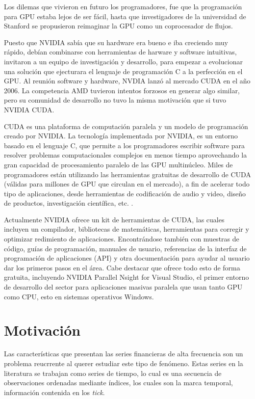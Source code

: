 Los dilemas que vivieron en futuro los programadores, fue que la programación para GPU estaba lejos de ser fácil, hasta que investigadores de la universidad de
Stanford se propusieron reimaginar la GPU como un coprocesador de flujos.

Puesto que NVIDIA sabía que su hardware era bueno e iba creciendo muy rápido, debían combinarse con herramientas de harware y software intuitivas, invitaron
a un equipo de investigación y desarrollo, para empezar a evolucionar una solución que ejecturara el lenguaje de programación C a la perfección en el GPU.
Al reunión software y hardware, NVDIA lanzó al mercado CUDA en el año 2006. La competencia AMD tuvieron intentos forzosos en generar algo similar, pero su comunidad
de desarrollo no tuvo la misma motivación que si tuvo NVIDIA CUDA.

CUDA es una plataforma de computación paralela y un modelo de programación creado por NVIDIA. La tecnología implementada por NVIDIA, es un entorno basado en el 
lenguaje C, que permite a los programadores escribir software para resolver problemas computacionales complejos en menos tiempo aprovechando la gran capacidad 
de procesamiento paralelo de las GPU multinúcleo. Miles de programadores están utilizando las herramientas gratuitas de desarrollo de CUDA (válidas para millones 
de GPU que circulan en el mercado), a fin de acelerar todo tipo de aplicaciones, desde herramientas de codificación de audio y video, diseño de productos, 
investigación científica, etc. \cite{kirk2007nvidia}.

Actualmente NVIDIA ofrece un kit de herramientas de CUDA, las cuales incluyen un compilador, bibliotecas de matemáticas, herramientas para corregir y optimizar
redimiento de aplicaciones. Encontrándose también con muestras de código, guías de programación, manuales de usuario, referencias de la interfaz de programación
de aplicaciones (API) y otra documentación para ayudar al usuario dar los primeros pasos en el área. Cabe destacar que ofrece todo esto de forma gratuita,
incluyendo NVIDIA Parallel Nsight for Visual Studio, el primer entorno de desarrollo del sector para aplicaciones masivas paralela que usan tanto GPU como CPU, esto
en sistemas operativos Windows.

\section{Motivación}

Las características que presentan las series financieras de alta frecuencia son un problema reucrrente al querer estudiar este tipo de fenómeno. 
Estas series en la literatura se trabajan como series de tiempo, lo cual es una secuencia de observaciones ordenadas mediante índices, los cuales
son la marca temporal, información contenida en los \emph{tick}. 

